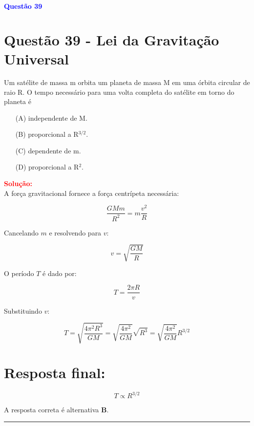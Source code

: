 \documentclass[a4paper,12pt]{article}
\begin{document}
\begin{flushleft}
\textbf{\textcolor{blue}{\Large Quest\~ao 39}}\\
\noindent
\section{Quest\~ao 39 - Lei da Gravitação Universal}
Um satélite de massa m orbita um planeta de massa M em
uma órbita circular de raio R. O tempo necessário para uma
volta completa do satélite em torno do planeta é

\begin{itemize}
\item[(A)] independente de M.
\item[(B)] proporcional a R$^{3/2}$.
\item[(C)] dependente de m.
\item[(D)] proporcional a R$^{2}$.
\end{itemize}

\vspace{0.5cm}

\textcolor{red}{\textbf{Solução:}}\\

A força gravitacional fornece a força centrípeta necessária:

\[
\frac{G M m}{R^2} = m \frac{v^2}{R}
\]

Cancelando \(m\) e resolvendo para \(v\):

\[
v = \sqrt{\frac{G M}{R}}
\]

O período \(T\) é dado por:

\[
T = \frac{2\pi R}{v}
\]

Substituindo \(v\):

\[
T =
\sqrt{\frac{4 \pi^{2} R^{3}}{G M}} =\sqrt{\frac{4 \pi^{2}}{G M}}\sqrt{R^{3}} = \sqrt{\frac{4 \pi^{2}}{G M}} R^{3/2}
\]


\section*{Resposta final:}

\[
\boxed{
T \propto R^{3/2}
}
\]


A resposta correta é alternativa \colorbox{green!50}{\textbf{B}}.
\end{flushleft}

\noindent\rule{\linewidth}{0.6pt}\\
\end{document}
